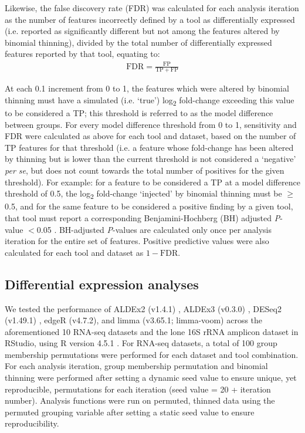 \documentclass[10pt,letterpaper]{article}
\begin{document}
Likewise, the false discovery rate (FDR) was calculated for each analysis iteration as the number of features incorrectly defined by a tool as differentially expressed (i.e. reported as significantly different but not among the features altered by binomial thinning), divided by the total number of differentially expressed features reported by that tool, equating to: 
\begin{eqnarray}
	\label{eq:FDR}
	\mathrm{FDR} = \frac{\mathrm{FP}}{\mathrm{TP} + \mathrm{FP}}
 \end{eqnarray}
 
At each 0.1 increment from 0 to 1, the features which were altered by binomial thinning must have a simulated (i.e. `true') log\textsubscript{2} fold-change exceeding this value to be considered a TP; this threshold is referred to as the model difference between groups. For every model difference threshold from 0 to 1, sensitivity and FDR were calculated as above for each tool and dataset, based on the number of TP features for that threshold (i.e. a feature whose fold-change has been altered by thinning but is lower than the current threshold is not considered a `negative' \textit{per se}, but does not count towards the total number of positives for the given threshold). For example: for a feature to be considered a TP at a model difference threshold of 0.5, the log\textsubscript{2} fold-change `injected' by binomial thinning must be $\geq$0.5, and for the same feature to be considered a positive finding by a given tool, that tool must report a corresponding Benjamini-Hochberg (BH) adjusted \textit{P}-value $<$0.05 \cite{benjamini:1995}. BH-adjusted \textit{P}-values are calculated only once per analysis iteration for the entire set of features. Positive predictive values were also calculated for each tool and dataset as $1 - \mathrm{FDR}$.

\subsection*{Differential expression analyses}
We tested the performance of ALDEx2 (v1.4.1) \cite{fernandes:2014}, ALDEx3 (v0.3.0) \cite{konnaris_uncertainty_2025}, DESeq2 (v1.49.1) \cite{love_moderated_2014}, edgeR (v4.7.2), and limma (v3.65.1; limma-voom) \cite{ritchie_limma_2015} across the aforementioned 10 RNA-seq datasets and the lone 16S rRNA amplicon dataset in RStudio, using R version 4.5.1 \cite{r_core_2025}. For RNA-seq datasets, a total of 100 group membership permutations were performed for each dataset and tool combination. For each analysis iteration, group membership permutation and binomial thinning were performed after setting a dynamic seed value to ensure unique, yet reproducible, permutations for each iteration (seed value = 20 + iteration number). Analysis functions were run on permuted, thinned data using the permuted grouping variable after setting a static seed value to ensure reproducibility. 
\end{document}
